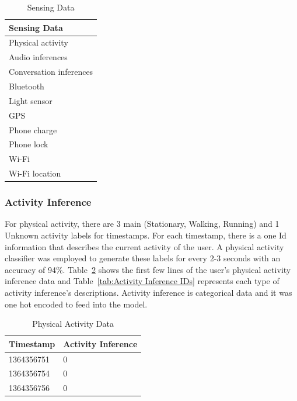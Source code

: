 \documentclass[12pt,oneandhalf,chaparabic,lfm,phd,eng,oneside,pntc]{gsufbe}
\begin{document}
\begin{table}[b!]
\centering
\caption{Sensing Data}
\label{tab:Sensing Data}
\begin{tabular}{|l|}
\hline
Sensing Data            \\ \hline
Physical activity       \\
Audio inferences        \\
Conversation inferences \\
Bluetooth               \\
Light sensor            \\
GPS                     \\
Phone charge            \\
Phone lock              \\
Wi-Fi                   \\
Wi-Fi location          \\ \hline
\end{tabular}
\end{table}

\subsubsection{Activity Inference}
\label{subsubsec:Activity Inference}
For physical activity, there are 3 main (Stationary, Walking, Running) and 1 Unknown activity labels for timestamps. For each timestamp, there is a one Id information that describes the current activity of the user. A physical activity classifier was employed to generate these labels for every 2-3 seconds with an accuracy of 94\%. Table~\ref{tab:Activity Data} shows the first few lines of the user's physical activity inference data and Table~\ref{tab:Activity Inference IDs} represents each type of activity inference's descriptions. Activity inference is categorical data and it was one hot encoded to feed into the model.

\begin{table}[b!]
\centering
\caption{Physical Activity Data}
\label{tab:Activity Data}
\begin{tabular}{|l|l|}
\hline
Timestamp  & Activity Inference \\ \hline
1364356751 & 0                  \\
1364356754 & 0                  \\
1364356756 & 0                  \\ \hline
\end{tabular}
\end{table}
\end{document}
